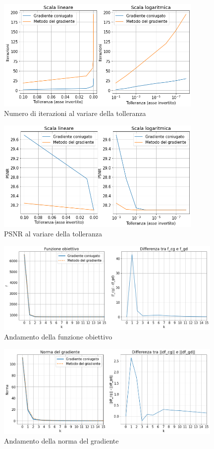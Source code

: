 \documentclass[11pt]{article}
\begin{document}
\begin{figure}[H]
    \centering
    \includegraphics[width=10cm]{iterazioni_cg_gd/2/tol_iter.png}
    \caption{Numero di iterazioni al variare della tolleranza}
    \label{fig:tol_iter2}
\end{figure}
\begin{figure}[H]
    \centering
    \includegraphics[width=10cm]{iterazioni_cg_gd/2/tol_psnr.png}
    \caption{PSNR al variare della tolleranza}
    \label{fig:tol_psnr2}
\end{figure}
\begin{figure}[H]
    \centering
    \includegraphics[width=11cm]{iterazioni_cg_gd/2/funzione_obiettivo.png}
    \caption{Andamento della funzione obiettivo}
    \label{fig:obiettivo2}
\end{figure}
\begin{figure}[H]
    \centering
    \includegraphics[width=11cm]{iterazioni_cg_gd/2/norma_gradiente.png}
    \caption{Andamento della norma del gradiente}
    \label{fig:gradiente2}
\end{figure}
\end{document}
